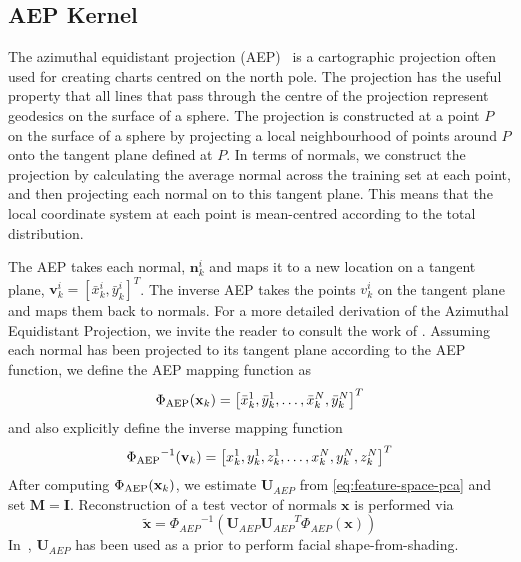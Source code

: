 \subsection{AEP Kernel}\label{subsec:sing_img_aep_kernel}
The azimuthal equidistant projection (AEP)~\cite{snyder1987map,smith2006recovering} is a
cartographic projection often used for creating charts centred on the north
pole. The projection has the useful property that all lines that pass through
the centre of the projection represent geodesics on the surface of a sphere. The
projection is constructed at a point $P$ on the surface of a sphere by
projecting a local neighbourhood of points around $P$ onto the tangent plane
defined at $P$. In terms of normals, we construct the projection by calculating
the average normal across the training set at each point, and then projecting
each normal on to this tangent plane. This means that the local coordinate
system at each point is mean-centred according to the total distribution.

The AEP takes each normal, $\mathbf{n}_k^i$ and maps it to a new location on
a tangent plane, $\mathbf{v}_k^i = [\bar{x}_k^i, \bar{y}_k^i]^T$. The
inverse AEP takes the points  $v_k^i$ on the tangent plane and maps them back to
normals. For a more detailed derivation of the Azimuthal Equidistant Projection,
we invite the reader to consult the work of \citet{smith2006recovering}. Assuming each
normal has been projected to its tangent plane according to the AEP function, we
define the AEP mapping function as
\begin{equation}\label{eq:aep-kernel}
    \Phi_{\operatorname{AEP}} (\boldsymbol{\mathbf{x}}_k) = \left[ \bar{x}_k^1, \bar{y}_k^1, \ldots, \bar{x}_k^N, \bar{y}_k^N \right]^T
\end{equation}
and also explicitly define the inverse mapping function
\begin{equation}\label{eq:inv-aep-kernel}
    {\Phi_{\operatorname{AEP}}}^{-1} (\boldsymbol{\mathbf{v}}_k) = \left[ x_k^1, y_k^1, z_k^1, \dots, x_k^N, y_k^N, z_k^N \right]^T
\end{equation}
After computing $\Phi_{\operatorname{AEP}} (\boldsymbol{\mathbf{x}}_k)$, we estimate $\mathbf{U}_{AEP}$ from 
\cref{eq:feature-space-pca} and set $\mathbf{M} = \mathbf{I}$. Reconstruction 
of a test vector of normals $\mathbf{x}$ is performed via
\begin{equation}\label{eq:aep-reconstruction}
   \tilde{\mathbf{x}} = {\Phi_{AEP}}^{-1} \left( \mathbf{U}_{AEP} {\mathbf{U}_{AEP}}^T \Phi_{AEP}(\mathbf{x}) \right)
\end{equation}
In~\cite{smith2006recovering}, $\mathbf{U}_{AEP}$ has been used as a prior to
perform facial shape-from-shading.
